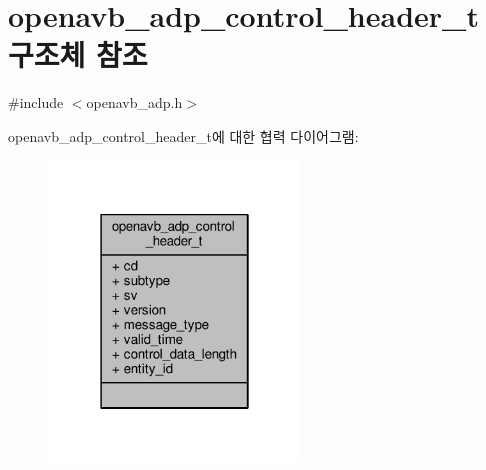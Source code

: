 \hypertarget{structopenavb__adp__control__header__t}{}\section{openavb\+\_\+adp\+\_\+control\+\_\+header\+\_\+t 구조체 참조}
\label{structopenavb__adp__control__header__t}


{\ttfamily \#include $<$openavb\+\_\+adp.\+h$>$}



openavb\+\_\+adp\+\_\+control\+\_\+header\+\_\+t에 대한 협력 다이어그램\+:
\nopagebreak
\begin{figure}[H]
\begin{center}
\leavevmode
\includegraphics[width=190pt]{structopenavb__adp__control__header__t__coll__graph}
\end{center}
\end{figure}
